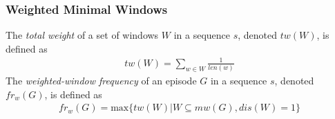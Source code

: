\subsubsection{Weighted Minimal Windows}

\begin{definition}
The \emph{total weight} of a set of windows $ W $ in a sequence $ s $, denoted $ tw(W) $, is defined as
\begin{align*}
tw(W) = \sum_{w \in W}{\frac{1}{len(w)}}
\end{align*}
The \emph{weighted-window frequency} of an episode $ G $ in a sequence $ s $, denoted $ fr_w(G) $, is defined as
\begin{align*}
fr_w(G) = \text{max} \{ tw(W) | W \subseteq mw(G), dis(W) = 1 \}
\end{align*}
\end{definition}
